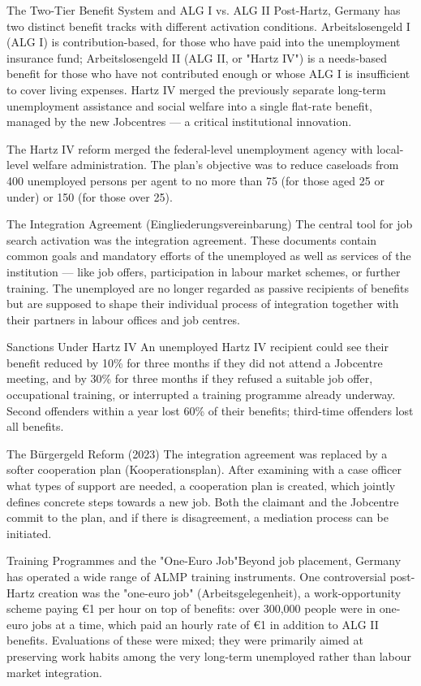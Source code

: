 \documentclass[12pt]{article}
\theoremstyle{definition}
\theoremstyle{remark}
\begin{document}
The Two-Tier Benefit System and ALG I vs. ALG II Post-Hartz, Germany has two distinct benefit tracks with different activation conditions. Arbeitslosengeld I (ALG I) is contribution-based, for those who have paid into the unemployment insurance fund; Arbeitslosengeld II (ALG II, or "Hartz IV") is a needs-based benefit for those who have not contributed enough or whose ALG I is insufficient to cover living expenses. Hartz IV merged the previously separate long-term unemployment assistance and social welfare into a single flat-rate benefit, managed by the new Jobcentres — a critical institutional innovation.

The Hartz IV reform merged the federal-level unemployment agency with local-level welfare administration. The plan's objective was to reduce caseloads from 400 unemployed persons per agent to no more than 75 (for those aged 25 or under) or 150 (for those over 25). 

The Integration Agreement (Eingliederungsvereinbarung) The central tool for job search activation was the integration agreement. These documents contain common goals and mandatory efforts of the unemployed as well as services of the institution — like job offers, participation in labour market schemes, or further training. The unemployed are no longer regarded as passive recipients of benefits but are supposed to shape their individual process of integration together with their partners in labour offices and job centres.

Sanctions Under Hartz IV An unemployed Hartz IV recipient could see their benefit reduced by 10\% for three months if they did not attend a Jobcentre meeting, and by 30\% for three months if they refused a suitable job offer, occupational training, or interrupted a training programme already underway. Second offenders within a year lost 60\% of their benefits; third-time offenders lost all benefits. 

The Bürgergeld Reform (2023) The integration agreement was replaced by a softer cooperation plan (Kooperationsplan). After examining with a case officer what types of support are needed, a cooperation plan is created, which jointly defines concrete steps towards a new job. Both the claimant and the Jobcentre commit to the plan, and if there is disagreement, a mediation process can be initiated. 

Training Programmes and the "One-Euro Job"Beyond job placement, Germany has operated a wide range of ALMP training instruments. One controversial post-Hartz creation was the "one-euro job" (Arbeitsgelegenheit), a work-opportunity scheme paying €1 per hour on top of benefits: over 300,000 people were in one-euro jobs at a time, which paid an hourly rate of €1 in addition to ALG II benefits. Evaluations of these were mixed; they were primarily aimed at preserving work habits among the very long-term unemployed rather than labour market integration. 
\end{document}
